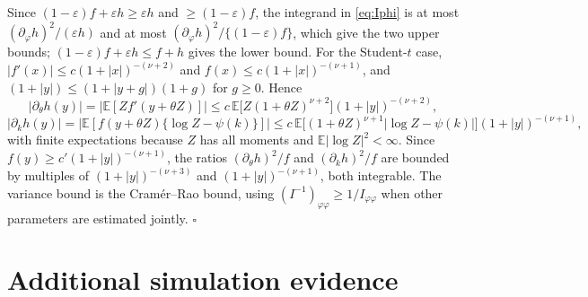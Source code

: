 \documentclass[11pt,a4paper]{article}
\theoremstyle{definition}
\theoremstyle{remark}
\newcommand{\E}{\mathbb{E}}
\begin{document}
Since $(1-\varepsilon)f+\varepsilon h\ge\varepsilon h$ and $\ge(1-\varepsilon)f$, the integrand in \eqref{eq:Iphi} is at most $(\partial_\varphi h)^2/(\varepsilon h)$ and at most $(\partial_\varphi h)^2/\{(1-\varepsilon)f\}$, which give the two upper bounds; $(1-\varepsilon)f+\varepsilon h\le f+h$ gives the lower bound. For the Student-$t$ case, $|f'(x)|\le c(1+|x|)^{-(\nu+2)}$ and $f(x)\le c(1+|x|)^{-(\nu+1)}$, and $(1+|y|)\le(1+|y+g|)(1+g)$ for $g\ge0$. Hence
\[
|\partial_\theta h(y)|=\big|\E[Zf'(y+\theta Z)]\big|\le c\,\E\big[Z(1+\theta Z)^{\nu+2}\big](1+|y|)^{-(\nu+2)},
\]
\[
|\partial_kh(y)|=\big|\E[f(y+\theta Z)\{\log Z-\psi(k)\}]\big|\le c\,\E\big[(1+\theta Z)^{\nu+1}|\log Z-\psi(k)|\big](1+|y|)^{-(\nu+1)},
\]
with finite expectations because $Z$ has all moments and $\E|\log Z|^2<\infty$. Since $f(y)\ge c'(1+|y|)^{-(\nu+1)}$, the ratios $(\partial_\theta h)^2/f$ and $(\partial_kh)^2/f$ are bounded by multiples of $(1+|y|)^{-(\nu+3)}$ and $(1+|y|)^{-(\nu+1)}$, both integrable. The variance bound is the Cram\'er--Rao bound, using $(I^{-1})_{\varphi\varphi}\ge1/I_{\varphi\varphi}$ when other parameters are estimated jointly.
\hfill$\square$

\section{Additional simulation evidence}\label{app:extra}
\end{document}
